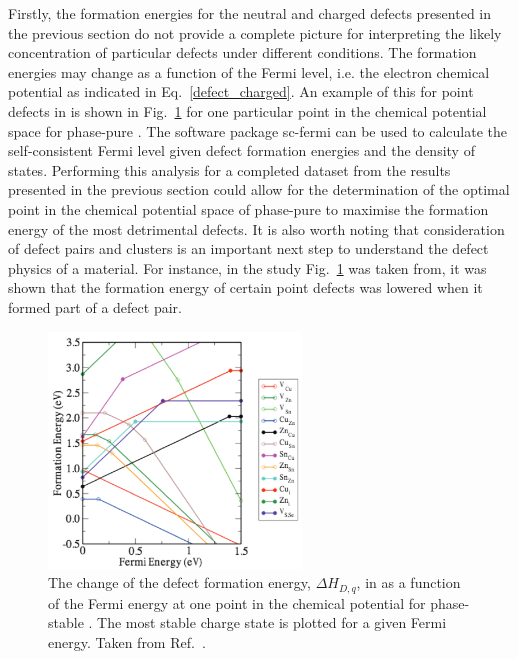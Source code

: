 \documentclass[11pt, twoside]{report}
\begin{document}
Firstly, the formation energies for the neutral and charged defects presented in the previous section do not provide a complete picture for interpreting the likely concentration of particular defects under different conditions. The formation energies may change as a function of the Fermi level, i.e. the electron chemical potential as indicated in Eq.~\ref{defect_charged}. An example of this for point defects in {\CZTS} is shown in Fig.~\ref{Chen_defects_map} for one particular point in the chemical potential space for phase-pure {\CZTS}. The software package sc-fermi \cite{sc-fermi} can be used to calculate the self-consistent Fermi level given defect formation energies and the density of states. Performing this analysis for a completed dataset from the results presented in the previous section could allow for the determination of the optimal point in the chemical potential space of phase-pure {\enargite} to maximise the formation energy of the most detrimental defects. It is also worth noting that consideration of defect pairs and clusters is an important next step to understand the defect physics of a material. For instance, in the study Fig.~\ref{Chen_defects_map} was taken from, it was shown that the formation energy of certain point defects was lowered when it formed part of a defect pair.

\begin{figure}[h!]
    \centering
    \includegraphics[width=0.6\textwidth]{figures/Chen_defects_map.png}
    \caption[The change of the defect formation energy, $\Delta H_{D, q}$,in {\CZTS} as a  function of the Fermi energy at one point in the chemical potential space for phase-stable {\CZTS}. The most stable charge state is plotted for a given Fermi energy.]{The change of the defect formation energy, $\Delta H_{D, q}$, in {\CZTS} as a  function of the Fermi energy at one point in the chemical potential for phase-stable {\CZTS}. The most stable charge state is plotted for a given Fermi energy. Taken from Ref.~.}
    \label{Chen_defects_map}
\end{figure}
\end{document}
